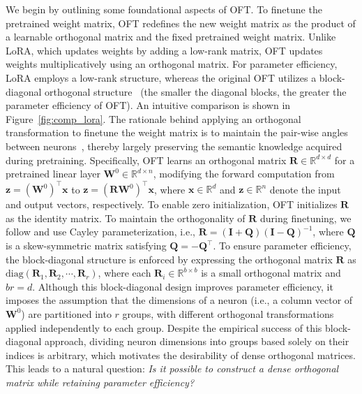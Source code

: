 We begin by outlining some foundational aspects of OFT. To finetune the pretrained weight matrix, OFT redefines the new weight matrix as the product of a learnable orthogonal matrix and the fixed pretrained weight matrix. Unlike LoRA, which updates weights by adding a low-rank matrix, OFT updates weights multiplicatively using an orthogonal matrix. For parameter efficiency, LoRA employs a low-rank structure, whereas the original OFT utilizes a block-diagonal orthogonal structure~\cite{qiu2023controlling} (the smaller the diagonal blocks, the greater the parameter efficiency of OFT). An intuitive comparison is shown in Figure~\ref{fig:comp_lora}. The rationale behind applying an orthogonal transformation to finetune the weight matrix is to maintain the pair-wise angles between neurons~\cite{liu2018learning,liu2021orthogonal,qiu2023controlling}, thereby largely preserving the semantic knowledge acquired during pretraining. Specifically, OFT learns an orthogonal matrix $\bm{R}\in\mathbb{R}^{d\times d}$ for a pretrained linear layer $\bm{W}^0\in\mathbb{R}^{d\times n}$, modifying the forward computation from $\bm{z}=(\bm{W}^0)^\top\bm{x}$ to $\bm{z}=(\bm{R}\bm{W}^0)^\top\bm{x}$, where $\bm{x}\in\mathbb{R}^{d}$ and $\bm{z}\in\mathbb{R}^{n}$ denote the input and output vectors, respectively. To enable zero initialization, OFT initializes $\bm{R}$ as the identity matrix. To maintain the orthogonality of $\bm{R}$ during finetuning, we follow \cite{qiu2023controlling,liu2021orthogonal} and use Cayley parameterization, i.e., $\bm{R}=(\bm{I}+\bm{Q})(\bm{I}-\bm{Q})^{-1}$, where $\bm{Q}$ is a skew-symmetric matrix satisfying $\bm{Q}=-\bm{Q}^\top$. To ensure parameter efficiency, the block-diagonal structure is enforced by expressing the orthogonal matrix $\bm{R}$ as $\text{diag}(\bm{R}_1,\bm{R}_2,\cdots,\bm{R}_r)$, where each $\bm{R}_i\in\mathbb{R}^{b\times b}$ is a small orthogonal matrix and $br=d$. Although this block-diagonal design improves parameter efficiency, it imposes the assumption that the dimensions of a neuron (i.e., a column vector of $\bm{W}^0$) are partitioned into $r$ groups, with different orthogonal transformations applied independently to each group. Despite the empirical success of this block-diagonal approach, dividing neuron dimensions into groups based solely on their indices is arbitrary, which motivates the desirability of dense orthogonal matrices. This leads to a natural question: \emph{Is it possible to construct a dense orthogonal matrix while retaining parameter efficiency?}

